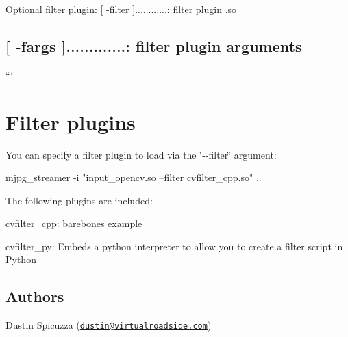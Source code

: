 Optional filter plugin\+: \mbox{[} -\/filter \mbox{]}............\+: filter plugin .so \subsection*{\mbox{[} -\/fargs \mbox{]}.............\+: filter plugin arguments }

```

\section*{Filter plugins }

You can specify a filter plugin to load via the \char`\"{}-\/-\/filter\char`\"{} argument\+: \begin{DoxyVerb}mjpg_streamer -i "input_opencv.so --filter cvfilter_cpp.so" .. 
\end{DoxyVerb}


The following plugins are included\+:


\begin{DoxyItemize}
\item cvfilter\+\_\+cpp\+: barebones example
\item cvfilter\+\_\+py\+: Embeds a python interpreter to allow you to create a filter script in Python
\end{DoxyItemize}

\subsection*{Authors }

Dustin Spicuzza (\href{mailto:dustin@virtualroadside.com}{\tt dustin@virtualroadside.\+com}) 